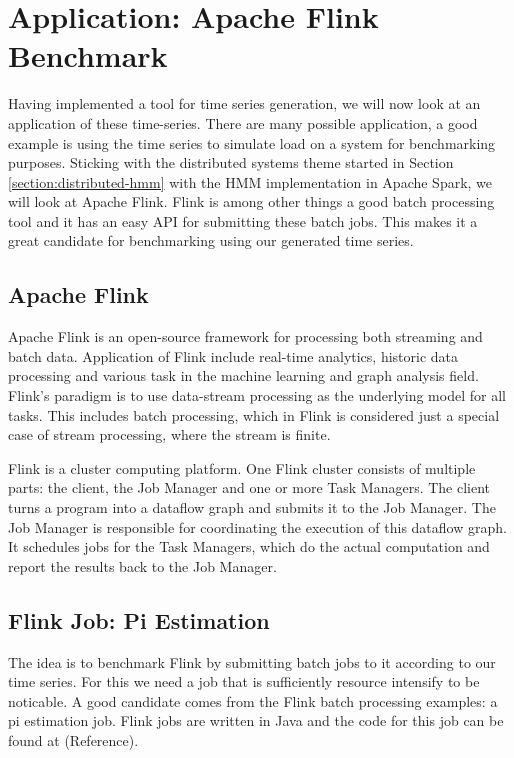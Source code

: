 \chapter{Application: Apache Flink Benchmark}\label{chapter:benchmark}

Having implemented a tool for time series generation, we will now look at an application of these time-series. There are many possible application, a good example is using the time series to simulate load on a system for benchmarking purposes. Sticking with the distributed systems theme started in Section \ref{section:distributed-hmm} with the HMM implementation in Apache Spark, we will look at Apache Flink. Flink is among other things a good batch processing tool and it has an easy API for submitting these batch jobs. This makes it a great candidate for benchmarking using our generated time series. 

\section{Apache Flink}

Apache Flink is an open-source framework for processing both streaming and batch data. Application of Flink include real-time analytics, historic data processing and various task in the machine learning and graph analysis field. Flink's paradigm is to use data-stream processing as the underlying model for all tasks. This includes batch processing, which in Flink is considered just a special case of stream processing, where the stream is finite. 

Flink is a cluster computing platform. One Flink cluster consists of multiple parts: the client, the Job Manager and one or more Task Managers. The client turns a program into a dataflow graph and submits it to the Job Manager. The Job Manager is responsible for coordinating the execution of this dataflow graph. It schedules jobs for the Task Managers, which do the actual computation and report the results back to the Job Manager. 

\section{Flink Job: Pi Estimation}

The idea is to benchmark Flink by submitting batch jobs to it according to our time series. For this we need a job that is sufficiently resource intensify to be noticable. A good candidate comes from the Flink batch processing examples: a pi estimation job. Flink jobs are written in Java and the code for this job can be found at (Reference). 

